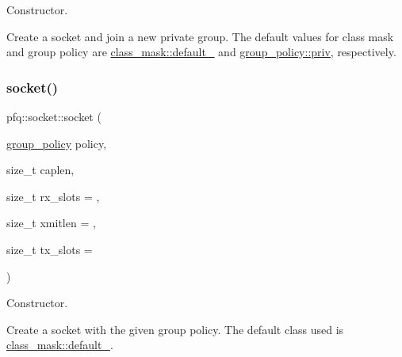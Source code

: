 Constructor. 

Create a socket and join a new private group. The default values for class mask and group policy are \hyperlink{namespacepfq_a96af1f5ed530eff563eb917516758fbba172b03053216c6158fe380805998ad6c}{class\+\_\+mask\+::default\+\_\+} and \hyperlink{namespacepfq_ac41249c8510558905b01fa4d866a38d7a908b453051b556e053731714a5193921}{group\+\_\+policy\+::priv}, respectively. \mbox{\label{classpfq_1_1socket_ab502dbc0907cbbe0168ea0837178d86a}} 
\subsubsection{\texorpdfstring{socket()}{socket()}\hspace{0.1cm}{\footnotesize\ttfamily [4/7]}}
{\footnotesize\ttfamily pfq\+::socket\+::socket (\begin{DoxyParamCaption}\item[{\hyperlink{namespacepfq_ac41249c8510558905b01fa4d866a38d7}{group\+\_\+policy}}]{policy,  }\item[{size\+\_\+t}]{caplen,  }\item[{size\+\_\+t}]{rx\+\_\+slots = {},  }\item[{size\+\_\+t}]{xmitlen = {},  }\item[{size\+\_\+t}]{tx\+\_\+slots = {} }\end{DoxyParamCaption})\hspace{0.3cm}{\ttfamily [inline]}}



Constructor. 

Create a socket with the given group policy. The default class used is \hyperlink{namespacepfq_a96af1f5ed530eff563eb917516758fbba172b03053216c6158fe380805998ad6c}{class\+\_\+mask\+::default\+\_\+}. \mbox{\label{classpfq_1_1socket_a6cee87008b62d69f564743e63938e017}} 
